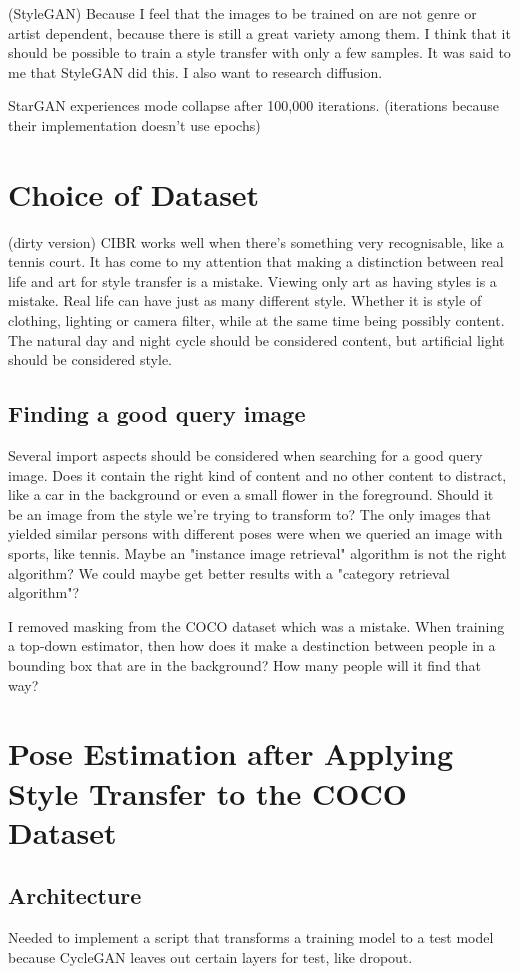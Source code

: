 (StyleGAN) Because I feel that the images to be trained on are not genre or artist dependent, because there is still a great variety among them.
I think that it should be possible to train a style transfer with only a few samples.
It was said to me that StyleGAN did this.
I also want to research diffusion.

StarGAN experiences mode collapse after 100,000 iterations. (iterations because their implementation doesn't use epochs)
\section{Choice of Dataset}
(dirty version)
CIBR works well when there's something very recognisable, like a tennis court.
It has come to my attention that making a distinction between real life and art for style transfer is a mistake.
Viewing only art as having styles is a mistake.
Real life can have just as many different style.
Whether it is style of clothing, lighting or camera filter, while at the same time being possibly content.
The natural day and night cycle should be considered content, but artificial light should be considered style.
\subsection{Finding a good query image}
Several import aspects should be considered when searching for a good query image.
Does it contain the right kind of content and no other content to distract, like a car in the background or even a small flower in the foreground.
Should it be an image from the style we're trying to transform to?
The only images that yielded similar persons with different poses were when we queried an image with sports, like tennis.
Maybe an "instance image retrieval" algorithm is not the right algorithm? We could maybe get better results with a "category retrieval algorithm"?

I removed masking from the COCO dataset which was a mistake. 
When training a top-down estimator, then how does it make a destinction between people in a bounding box that are in the background?
How many people will it find that way?

\section{Pose Estimation after Applying Style Transfer to the COCO Dataset}
\label{sec:baseline_coco_style_transfer}

\subsection{Architecture}
\label{sec:baseline_coco_style_transfer_architecture}
Needed to implement a script that transforms a training model to a test model because CycleGAN leaves out certain layers for test, like dropout.

